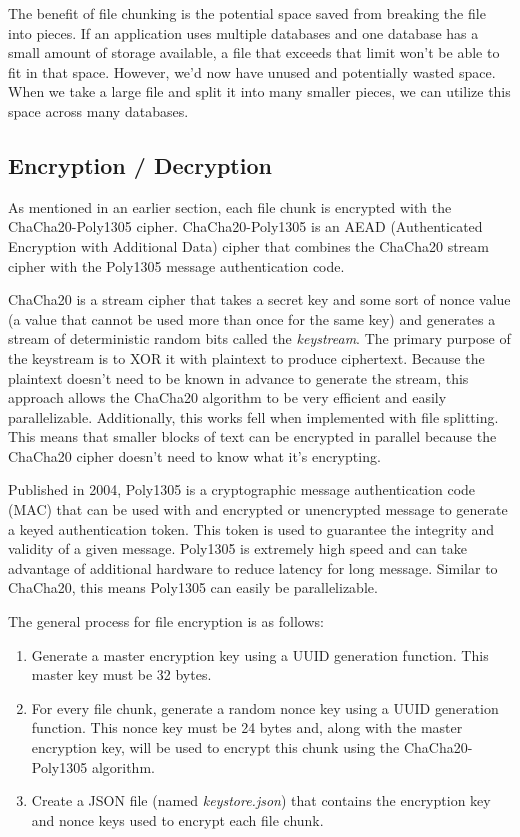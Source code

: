 \documentclass[conference]{IEEEtran}
\begin{document}
\medskip
\indent
The benefit of file chunking is the potential space saved from breaking the file into pieces.
If an application uses multiple databases and one database has a small amount of storage
available, a file that exceeds that limit won't be able to fit in that space. However, we'd
now have unused and potentially wasted space. When we take a large file and split it into many
smaller pieces, we can utilize this space across many databases.

\subsection{Encryption / Decryption}

As mentioned in an earlier section, each file chunk is encrypted with the ChaCha20-Poly1305
cipher. ChaCha20-Poly1305 is an AEAD (Authenticated Encryption with Additional Data) cipher
that combines the ChaCha20 stream cipher with the Poly1305 message authentication code.

\medskip
\indent
ChaCha20 is a stream cipher that takes a secret key and some sort of nonce value (a value
that cannot be used more than once for the same key) and generates a stream of deterministic
random bits called the \textit{keystream}. The primary purpose of the keystream is to XOR
it with plaintext to produce ciphertext. Because the plaintext doesn't need to be known
in advance to generate the stream, this approach allows the ChaCha20 algorithm to be
very efficient and easily parallelizable. Additionally, this works fell when implemented
with file splitting. This means that smaller blocks of text can be encrypted in parallel
because the ChaCha20 cipher doesn't need to know what it's encrypting.

\medskip
\indent
Published in 2004, Poly1305 is a cryptographic message authentication code (MAC) that can be
used with and encrypted or unencrypted message to generate a keyed authentication token. This
token is used to guarantee the integrity and validity of a given message. Poly1305 is
extremely high speed and can take advantage of additional hardware to reduce latency for
long message. Similar to ChaCha20, this means Poly1305 can easily be parallelizable.

\medskip
\indent The general process for file encryption is as follows:
\begin{enumerate}
    \item
        Generate a master encryption key using a UUID generation function. This master key
        must be 32 bytes.
    \item
        For every file chunk, generate a random nonce key using a UUID generation function.
        This nonce key must be 24 bytes and, along with the master encryption key, will
        be used to encrypt this chunk using the ChaCha20-Poly1305 algorithm.
	\item 
		Create a JSON file (named \textit{keystore.json}) that contains the encryption
		key and nonce keys used to encrypt each file chunk.
\end{enumerate}
\end{document}
